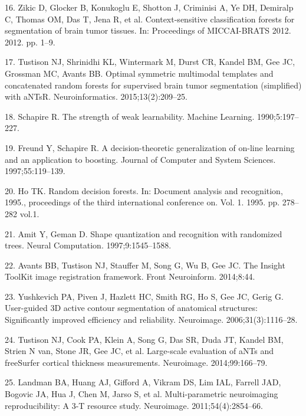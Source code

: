 \documentclass[11pt,]{article}
\begin{document}
\hypertarget{ref-zikic2012}{}
16. Zikic D, Glocker B, Konukoglu E, Shotton J, Criminisi A, Ye DH,
Demiralp C, Thomas OM, Das T, Jena R, et al. Context-sensitive
classification forests for segmentation of brain tumor tissues. In:
Proceedings of MICCAI-BRATS 2012. 2012. pp. 1--9.

\hypertarget{ref-Tustison:2015aa}{}
17. Tustison NJ, Shrinidhi KL, Wintermark M, Durst CR, Kandel BM, Gee
JC, Grossman MC, Avants BB. Optimal symmetric multimodal templates and
concatenated random forests for supervised brain tumor segmentation
(simplified) with aNTsR. Neuroinformatics. 2015;13(2):209--25.

\hypertarget{ref-schapire1990}{}
18. Schapire R. The strength of weak learnability. Machine Learning.
1990;5:197--227.

\hypertarget{ref-freund1997}{}
19. Freund Y, Schapire R. A decision-theoretic generalization of on-line
learning and an application to boosting. Journal of Computer and System
Sciences. 1997;55:119--139.

\hypertarget{ref-ho1995}{}
20. Ho TK. Random decision forests. In: Document analysis and
recognition, 1995., proceedings of the third international conference
on. Vol. 1. 1995. pp. 278--282 vol.1.

\hypertarget{ref-amit1997}{}
21. Amit Y, Geman D. Shape quantization and recognition with randomized
trees. Neural Computation. 1997;9:1545--1588.

\hypertarget{ref-Avants:2014aa}{}
22. Avants BB, Tustison NJ, Stauffer M, Song G, Wu B, Gee JC. The
Insight ToolKit image registration framework. Front Neuroinform.
2014;8:44.

\hypertarget{ref-Yushkevich:2006aa}{}
23. Yushkevich PA, Piven J, Hazlett HC, Smith RG, Ho S, Gee JC, Gerig G.
User-guided 3D active contour segmentation of anatomical structures:
Significantly improved efficiency and reliability. Neuroimage.
2006;31(3):1116--28.

\hypertarget{ref-Tustison:2014ab}{}
24. Tustison NJ, Cook PA, Klein A, Song G, Das SR, Duda JT, Kandel BM,
Strien N van, Stone JR, Gee JC, et al. Large-scale evaluation of aNTs
and freeSurfer cortical thickness measurements. Neuroimage.
2014;99:166--79.

\hypertarget{ref-landman2011}{}
25. Landman BA, Huang AJ, Gifford A, Vikram DS, Lim IAL, Farrell JAD,
Bogovic JA, Hua J, Chen M, Jarso S, et al. Multi-parametric neuroimaging
reproducibility: A 3-T resource study. Neuroimage. 2011;54(4):2854--66.
\end{document}

